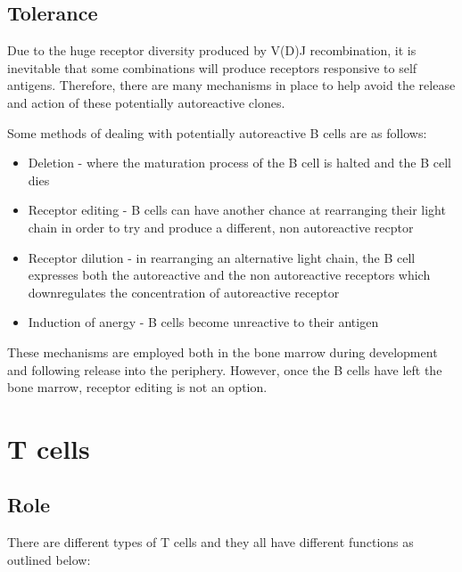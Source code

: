 \subsection{Tolerance}

Due to the huge receptor diversity produced by V(D)J recombination, it is inevitable that some combinations will produce receptors responsive to self antigens.
Therefore, there are many mechanisms in place to help avoid the release and action of these potentially autoreactive clones.

Some methods of dealing with potentially autoreactive B cells are as follows:
\begin{itemize}
\item Deletion - where the maturation process of the B cell is halted and the B cell dies \citep{Cornall1995}
\item Receptor editing - B cells can have another chance at rearranging their light chain in order to try and produce a different, non autoreactive recptor \citep{Orduno2009, Gay1993}
\item Receptor dilution - in rearranging an alternative light chain, the B cell expresses both the autoreactive and the non autoreactive receptors which downregulates the concentration of autoreactive receptor \citep{Gay1993, Orduno2009}
\item Induction of anergy - B cells become unreactive to their antigen \citep{Orduno2009}
\end{itemize}

These mechanisms are employed both in the bone marrow during development and following release into the periphery.
However, once the B cells have left the bone marrow, receptor editing is not an option.



\section{T cells}
\subsection{Role}
\label{subsec:Tcellfunctions}

There are different types of T cells and they all have different functions as outlined below:


